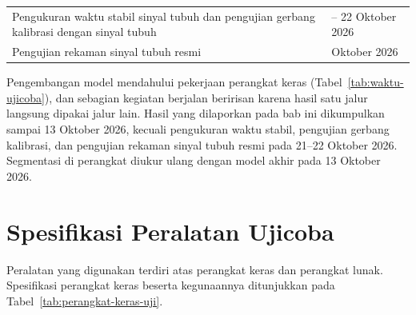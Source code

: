 \begin{table}[!ht]
\begin{tabularx}{\linewidth}{>{\RaggedRight\arraybackslash}X>{\RaggedRight\arraybackslash}p{4.4cm}}
    Pengukuran waktu stabil sinyal tubuh dan pengujian gerbang kalibrasi dengan sinyal tubuh & 21 -- 22 Oktober 2026 \\
    Pengujian rekaman sinyal tubuh resmi & 22 Oktober 2026 \\
    \bottomrule
  \end{tabularx}
  \par\vspace{2pt}{\footnotesize\raggedright Keterangan: antarmuka perangkat mencakup layar, menu, dan perekaman berjeda. Kegiatan 13 Oktober 2026 memakai rangkaian uji dengan peta pin PCB.\par}
\end{table}

Pengembangan model mendahului pekerjaan perangkat keras (Tabel~\ref{tab:waktu-ujicoba}), dan sebagian kegiatan berjalan beririsan karena hasil satu jalur langsung dipakai jalur lain. Hasil yang dilaporkan pada bab ini dikumpulkan sampai 13 Oktober 2026, kecuali pengukuran waktu stabil, pengujian gerbang kalibrasi, dan pengujian rekaman sinyal tubuh resmi pada 21--22 Oktober 2026. Segmentasi di perangkat diukur ulang dengan model akhir pada 13 Oktober 2026.


\section{Spesifikasi Peralatan Ujicoba}

Peralatan yang digunakan terdiri atas perangkat keras dan perangkat lunak. Spesifikasi perangkat keras beserta kegunaannya ditunjukkan pada Tabel~\ref{tab:perangkat-keras-uji}.

